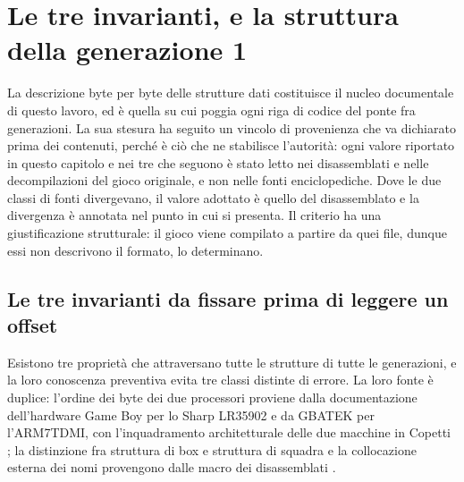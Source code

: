 
\chapter{Le tre invarianti, e la struttura della generazione 1}
\label{cap:gen1}

La descrizione byte per byte delle strutture dati costituisce il nucleo documentale di questo lavoro, ed è quella su cui poggia ogni riga di codice del ponte fra generazioni. La sua stesura ha seguito un vincolo di provenienza che va dichiarato prima dei contenuti, perché è ciò che ne stabilisce l'autorità: ogni valore riportato in questo capitolo e nei tre che seguono è stato letto nei disassemblati e nelle decompilazioni del gioco originale, e non nelle fonti enciclopediche. Dove le due classi di fonti divergevano, il valore adottato è quello del disassemblato e la divergenza è annotata nel punto in cui si presenta. Il criterio ha una giustificazione strutturale: il gioco viene compilato a partire da quei file, dunque essi non descrivono il formato, lo determinano.

\section{Le tre invarianti da fissare prima di leggere un offset}

Esistono tre proprietà che attraversano tutte le strutture di tutte le generazioni, e la loro conoscenza preventiva evita tre classi distinte di errore. La loro fonte è duplice: l'ordine dei byte dei due processori proviene dalla documentazione dell'hardware Game Boy \cite{pandocs} per lo Sharp LR35902 e da GBATEK \cite{gbatek} per l'ARM7TDMI, con l'inquadramento architetturale delle due macchine in Copetti \cite{copetti}; la distinzione fra struttura di box e struttura di squadra e la collocazione esterna dei nomi provengono dalle macro dei disassemblati \cite{pokered,pokecrystal,pokeemerald}.

